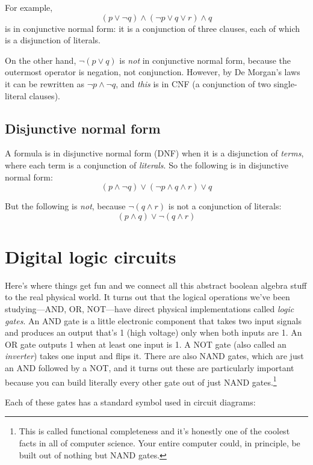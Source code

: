 \documentclass[11pt]{article}
\begin{document}
For example,
\[
  (p \vee \lnot q) \wedge (\lnot p \vee q \vee r) \wedge q
\]
is in conjunctive normal form: it is a conjunction of three clauses, each of which is a disjunction of literals.

On the other hand, $\lnot(p \vee q)$ is \emph{not} in conjunctive normal form, because the outermost operator is negation, not conjunction. However, by De Morgan's laws it can be rewritten as $\lnot p \wedge \lnot q$, and \emph{this} is in CNF (a conjunction of two single-literal clauses).

\subsection{Disjunctive normal form}

A formula is in disjunctive normal form (DNF) when it is a disjunction of \emph{terms}, where each term is a conjunction of \emph{literals}. So the following is in disjunctive normal form:
\[
  (p \wedge \lnot q) \vee (\lnot p \wedge q \wedge r) \vee q
\]

But the following is \emph{not}, because $\lnot(q \wedge r)$ is not a conjunction of literals:
\[
  (p \wedge q) \vee \lnot(q \wedge r)
\]

\section{Digital logic circuits}

Here's where things get fun and we connect all this abstract boolean algebra stuff to the real physical world. It turns out that the logical operations we've been studying---AND, OR, NOT---have direct physical implementations called \emph{logic gates}. An AND gate is a little electronic component that takes two input signals and produces an output that's 1 (high voltage) only when both inputs are 1. An OR gate outputs 1 when at least one input is 1. A NOT gate (also called an \emph{inverter}) takes one input and flips it. There are also NAND gates, which are just an AND followed by a NOT, and it turns out these are particularly important because you can build literally every other gate out of just NAND gates.\footnote{This is called functional completeness and it's honestly one of the coolest facts in all of computer science. Your entire computer could, in principle, be built out of nothing but NAND gates.}

Each of these gates has a standard symbol used in circuit diagrams:
\end{document}
